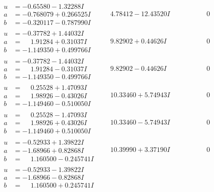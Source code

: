 \documentclass[1p]{elsarticle_modified}
\theoremstyle{definition}
\begin{document}
$$\begin{array}{c|c|c}
\begin{aligned}
u &= -0.65580 - 1.32288 I \\
a &= -0.768079 + 0.266525 I \\
b &= -0.320117 - 0.787990 I\end{aligned}
 & \phantom{-}4.78412 - 12.43520 I & \phantom{-0.000000 } 0 \\ \hline\begin{aligned}
u &= -0.37782 + 1.44032 I \\
a &= \phantom{-}1.91284 + 0.31037 I \\
b &= -1.149350 + 0.499766 I\end{aligned}
 & \phantom{-}9.82902 + 0.44626 I & \phantom{-0.000000 } 0 \\ \hline\begin{aligned}
u &= -0.37782 - 1.44032 I \\
a &= \phantom{-}1.91284 - 0.31037 I \\
b &= -1.149350 - 0.499766 I\end{aligned}
 & \phantom{-}9.82902 - 0.44626 I & \phantom{-0.000000 } 0 \\ \hline\begin{aligned}
u &= \phantom{-}0.25528 + 1.47093 I \\
a &= \phantom{-}1.98926 - 0.43026 I \\
b &= -1.149460 - 0.510050 I\end{aligned}
 & \phantom{-}10.33460 + 5.74943 I & \phantom{-0.000000 } 0 \\ \hline\begin{aligned}
u &= \phantom{-}0.25528 - 1.47093 I \\
a &= \phantom{-}1.98926 + 0.43026 I \\
b &= -1.149460 + 0.510050 I\end{aligned}
 & \phantom{-}10.33460 - 5.74943 I & \phantom{-0.000000 } 0 \\ \hline\begin{aligned}
u &= -0.52933 + 1.39822 I \\
a &= -1.68966 + 0.82868 I \\
b &= \phantom{-}1.160500 - 0.245741 I\end{aligned}
 & \phantom{-}10.39990 + 3.37190 I & \phantom{-0.000000 } 0 \\ \hline\begin{aligned}
u &= -0.52933 - 1.39822 I \\
a &= -1.68966 - 0.82868 I \\
b &= \phantom{-}1.160500 + 0.245741 I\end{aligned}

\end{array}$$
\end{document}

